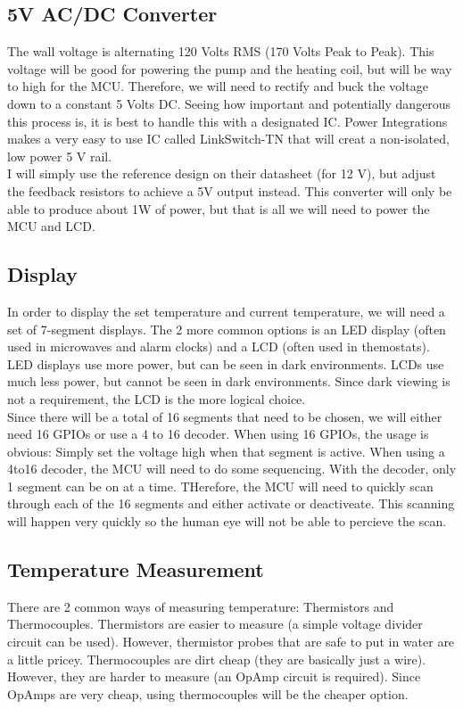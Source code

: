\documentclass[12pt,letterpaper]{article}
\begin{document}
\subsection{5V AC/DC Converter}
The wall voltage is alternating 120 Volts RMS (170 Volts Peak to Peak).  
This voltage will be good for powering the pump and the heating coil, but will be way to high for the MCU.
Therefore, we will need to rectify and buck the voltage down to a constant 5 Volts DC.
Seeing how important and potentially dangerous this process is, it is best to handle this with a designated IC.
Power Integrations makes a very easy to use IC called LinkSwitch-TN that will creat a non-isolated, low power 5 V rail.\\
I will simply use the reference design on their datasheet (for 12 V), but adjust the feedback resistors to achieve a 5V output instead.
This converter will only be able to produce about 1W of power, but that is all we will need to power the MCU and LCD.

\subsection{Display}
In order to display the set temperature and current temperature, we will need a set of 7-segment displays.
The 2 more common options is an LED display (often used in microwaves and alarm clocks) and a LCD (often used in themostats).
LED displays use more power, but can be seen in dark environments.
LCDs use much less power, but cannot be seen in dark environments.
Since dark viewing is not a requirement, the LCD is the more logical choice.\\

Since there will be a total of 16 segments that need to be chosen, we will either need 16 GPIOs or use a 4 to 16 decoder.
When using 16 GPIOs, the usage is obvious:  Simply set the voltage high when that segment is active.
When using a 4to16 decoder, the MCU will need to do some sequencing.
With the decoder, only 1 segment can be on at a time.  
THerefore, the MCU will need to quickly scan through each of the 16 segments and either activate or deactiveate.
This scanning will happen very quickly so the human eye will not be able to percieve the scan.

\subsection{Temperature Measurement}
There are 2 common ways of measuring temperature:  Thermistors and Thermocouples.
Thermistors are easier to measure (a simple voltage divider circuit can be used).
However, thermistor probes that are safe to put in water are a little pricey.
Thermocouples are dirt cheap (they are basically just a wire).  
However, they are harder to measure (an OpAmp circuit is required).
Since OpAmps are very cheap, using thermocouples will be the cheaper option.\\
\end{document}
